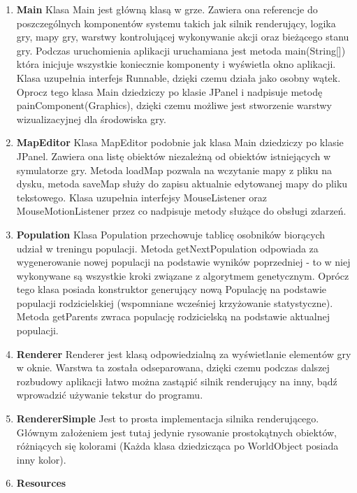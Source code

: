 \begin{par}
\begin{enumerate}
	\item{\bf Main }\newline
	Klasa Main jest główną klasą w grze. Zawiera ona referencje do poszczególnych komponentów systemu takich jak silnik renderujący, logika gry, mapy gry, warstwy kontrolującej wykonywanie akcji oraz bieżącego stanu gry.
	Podczas uruchomienia aplikacji uruchamiana jest metoda main(String[]) która inicjuje wszystkie koniecznie komponenty i wyświetla okno aplikacji.
	Klasa uzupełnia interfejs Runnable, dzięki czemu działa jako osobny wątek. Oprocz tego klasa Main dziedziczy po klasie JPanel i nadpisuje metodę painComponent(Graphics), dzięki czemu możliwe jest stworzenie warstwy wizualizacyjnej dla środowiska gry.
	\item{\bf MapEditor }\newline
	Klasa MapEditor podobnie jak klasa Main dziedziczy po klasie JPanel. Zawiera ona listę obiektów niezależną od obiektów istniejących w symulatorze gry. Metoda loadMap pozwala na wczytanie mapy z pliku na dysku, metoda saveMap służy do zapisu aktualnie edytowanej mapy do pliku tekstowego. Klasa uzupełnia interfejsy MouseListener oraz MouseMotionListener przez co nadpisuje metody służące do obsługi zdarzeń. 
	\item{\bf Population }\newline
	Klasa Population przechowuje tablicę osobników biorących udział w treningu populacji. 
	Metoda getNextPopulation odpowiada za wygenerowanie nowej populacji na podstawie wyników poprzedniej - to w niej wykonywane są wszystkie kroki związane z algorytmem genetycznym.
	Oprócz tego klasa posiada konstruktor generujący nową Populację na podstawie populacji rodzicielskiej (wspomniane wcześniej krzyżowanie statystyczne). Metoda getParents zwraca populację rodzicielską na podstawie aktualnej populacji.
	\item{\bf Renderer }\newline
	Renderer jest klasą odpowiedzialną za wyświetlanie elementów gry w oknie. Warstwa ta została odseparowana, dzięki czemu podczas dalszej rozbudowy aplikacji łatwo można zastąpić silnik renderujący na inny, bądź wprowadzić używanie tekstur do programu.
	\item{\bf RendererSimple }\newline
	Jest to prosta implementacja silnika renderującego. Głównym założeniem jest tutaj jedynie rysowanie prostokątnych obiektów, różniących się kolorami (Każda klasa dziedzicząca po WorldObject posiada inny kolor).
	\item{\bf Resources }\newline

\end{enumerate}
\end{par}

